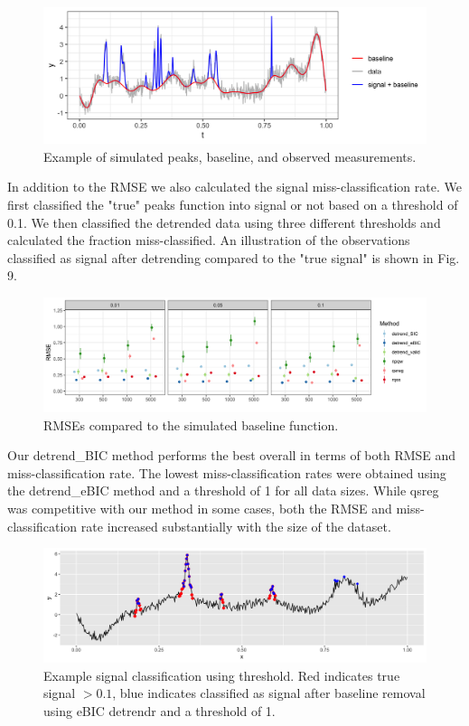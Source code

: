 \documentclass[12pt]{article}
\begin{document}
	\begin{figure}[h]
		\caption{Example of simulated peaks, baseline, and observed measurements.}
		\includegraphics[width = \linewidth]{Figures/ex_peaks.png}
	\end{figure}

	In addition to the RMSE we also calculated the signal miss-classification rate. We first classified the "true" peaks function into signal or not based on a threshold of 0.1. We then classified the detrended data using three different thresholds and calculated the fraction miss-classified. An illustration of the observations classified as signal after detrending compared to the "true signal" is shown in Fig. 9. 
	
	
	\begin{figure}[h!]
		\caption{RMSEs compared to the simulated baseline function.}
		\includegraphics[width = \linewidth]{Figures/peaks_mse.png}
	\end{figure}
	
	Our detrend\_BIC method performs the best overall in terms of both RMSE and miss-classification rate. The lowest miss-classification rates were obtained using the detrend\_eBIC method and a threshold of 1 for all data sizes. While qsreg was competitive with our method in some cases, both the RMSE and miss-classification rate increased substantially with the size of the dataset. 
	
	\begin{figure}[h!]
		\caption{Example signal classification using threshold. Red indicates true signal $>0.1$, blue indicates classified as signal after baseline removal using eBIC detrendr and a threshold of 1.}
		\includegraphics[width = \linewidth]{Figures/peaks_eg_class.png}
	\end{figure}
	
\end{document}
